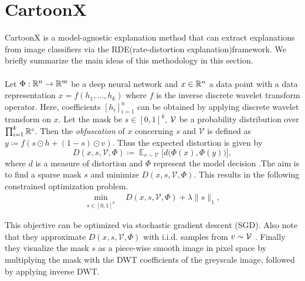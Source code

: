 \section{CartoonX}\label{sec:cartoonx}
CartoonX is a model-agnostic explanation method that can extract explanations from image classifiers via the RDE(rate-distortion explanation)framework. We briefly summarize the main ideas of this methodology in this section.\\
\\
Let $\Phi:\mathbb{R}^n\to\mathbb{R}^m$ be a deep neural network and $x\in \mathbb{R}^n $ a data point with a data representation $x =f(h_1,...,h_k)$ where $f$ is the inverse discrete wavelet transform operator. Here, coefficients $[h_i]_{i=1}^n$ can be obtained by applying discrete wavelet transform on $x$. Let the mask be $s\in[0,1]^k$,  $\mathcal{V}$ be a probability distribution over $\prod_{i=1}^k\mathbb{R}^{c}$. Then the \emph{obfuscation} of $x$ concerning $s$ and $\mathcal{V}$ is defined as
$y \coloneqq f(s\odot h + (1-s)\odot v)$. Thus the expected distortion is given by
$$
D(x,s,\mathcal{V}, \Phi)\coloneqq \mathop{\mathbb{E}}_{v\sim \mathcal{V}} \Big[ d\Big(\Phi(x), \Phi(y)\Big)\Big],
$$
where $d$ is a measure of distortion and $\Phi$ represent the model decision .The aim is to find a sparse mask $s$ and minimize $D(x,s,\mathcal{V}, \Phi)$. This results in the following constrained optimization problem.
\begin{align}\label{eq:relax_problem_ell1}
    \min_{s\in [0,1]^k} \quad D(x,s,\mathcal{V}, \Phi) + \lambda \|s\|_1,
\end{align}

This objective can be optimized via stochastic gradient descent (SGD). Also note that they approximate $D(x,s,\mathcal{V}, \Phi)$ with i.i.d. samples from $v\sim \mathcal{V}$ . Finally they visualize the mask $s$ as a piece-wise smooth image in pixel
space by multiplying the mask with the DWT coefficients of the greyscale image, followed by applying inverse DWT.


